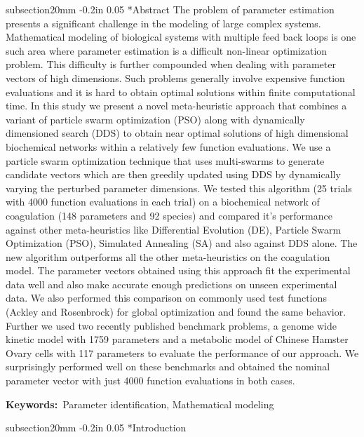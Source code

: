 \documentclass[12pt]{article}
\makeatletter
\renewcommand\section{\@startsection
	{subsection}{2}{0mm}
	{-0.2in}
	{0.05\baselineskip}
	{\normalfont\large\bfseries}}
\makeatother
\begin{document}
\section*{Abstract}
The problem of parameter estimation presents a significant challenge in the modeling of large complex systems. Mathematical modeling of biological systems with multiple feed back loops is one such area where parameter estimation is a difficult non-linear optimization problem. This difficulty is further compounded when dealing with parameter vectors of high dimensions. Such problems generally involve expensive function evaluations and it is hard to obtain optimal solutions within finite computational time. In this study we present a novel meta-heuristic approach that combines a variant of particle swarm optimization (PSO) along with dynamically dimensioned search (DDS) to obtain near optimal solutions of high dimensional biochemical networks within a relatively few function evaluations. We use a particle swarm optimization technique that uses multi-swarms to generate candidate vectors which are then greedily updated using DDS by dynamically varying the perturbed parameter dimensions. We tested this algorithm (25 trials with 4000 function evaluations in each trial) on a biochemical network of coagulation (148 parameters and 92 species) and compared it's performance against other meta-heuristics like Differential Evolution (DE), Particle Swarm Optimization (PSO), Simulated Annealing (SA) and also against DDS alone. The new algorithm outperforms all the other meta-heuristics on the coagulation model. The parameter vectors obtained using this approach fit the experimental data well and also make accurate enough predictions on unseen experimental data. We also performed this comparison on commonly used test functions (Ackley and Rosenbrock) for global optimization and found the same behavior. Further we used two recently published benchmark problems, a genome wide kinetic model with 1759 parameters and a metabolic model of Chinese Hamster Ovary cells with 117 parameters to evaluate the performance of our approach. We  surprisingly performed well on these benchmarks and obtained the nominal parameter vector with just 4000 function evaluations in both cases.

{\noindent \textbf{Keywords:}~Parameter identification, Mathematical modeling}

\pagebreak

\setcounter{page}{1}

\linenumbers

\section*{Introduction}
\end{document}
